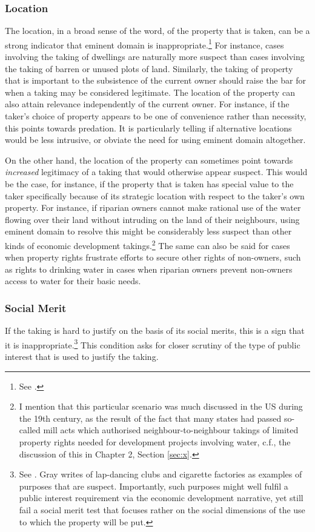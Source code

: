 \subsubsection*{Location}

The location, in a broad sense of the word, of the property that is taken, can be a strong indicator that eminent domain is inappropriate.\footnote{See \cite[33-34]{gray11}.} For instance, cases involving the taking of dwellings are naturally more suspect than cases involving the taking of barren or unused plots of land. Similarly, the taking of property that is important to the subsistence of the current owner should raise the bar for when a taking may be considered legitimate. The location of the property can also attain relevance independently of the current owner. For instance, if the taker's choice of property appears to be one of convenience rather than necessity, this points towards predation. It is particularly telling if alternative locations would be less intrusive, or obviate the need for using eminent domain altogether.

On the other hand, the location of the property can sometimes point towards {\it increased} legitimacy of a taking that would otherwise appear suspect. This would be the case, for instance, if the property that is taken has special value to the taker specifically because of its strategic location with respect to the taker's own property. For instance, if riparian owners cannot make rational use of the water flowing over their land without intruding on the land of their neighbours, using eminent domain to resolve this might be considerably less suspect than other kinds of economic development takings.\footnote{I mention that this particular scenario was much discussed in the US during the 19th century, as the result of the fact that many states had passed so-called mill acts which authorised neighbour-to-neighbour takings of limited property rights needed for development projects involving water, c.f., the discussion of this in Chapter 2, Section \ref{sec:x}.} The same can also be said for cases when property rights frustrate efforts to secure other rights of non-owners, such as rights to drinking water in cases when riparian owners prevent non-owners access to water for their basic needs.

\subsubsection*{Social Merit}

If the taking is hard to justify on the basis of its social merits, this is a sign that it is inappropriate.\footnote{See \cite[34]{gray11}. Gray writes of lap-dancing clubs and cigarette factories as examples of purposes that are suspect. Importantly, such purposes might well fulfil a public interest requirement via the economic development narrative, yet still fail a social merit test that focuses rather on the social dimensions of the use to which the property will be put.} This condition asks for closer scrutiny of the type of public interest that is used to justify the taking.

